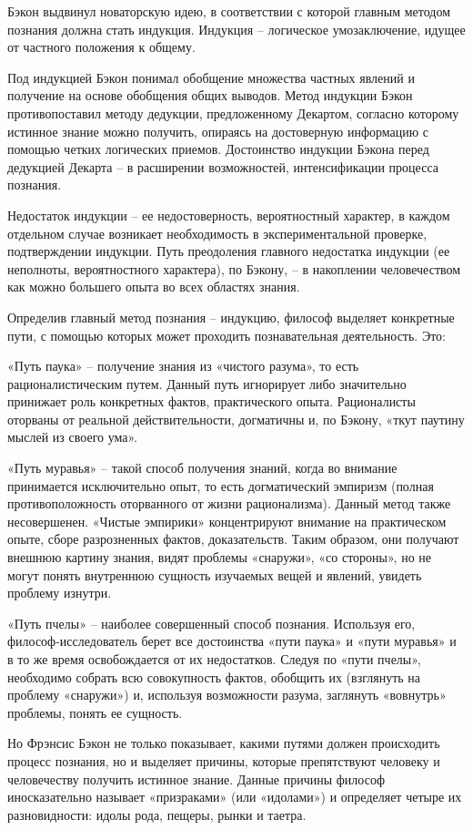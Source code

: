 \documentclass[
]{article}
\begin{document}
Бэкон выдвинул новаторскую идею, в соответствии с которой главным
методом познания должна стать индукция. Индукция -- логическое
умозаключение, идущее от частного положения к общему.

Под индукцией Бэкон понимал обобщение множества частных явлений и
получение на основе обобщения общих выводов. Метод индукции Бэкон
противопоставил методу дедукции, предложенному Декартом, согласно
которому истинное знание можно получить, опираясь на достоверную
информацию с помощью четких логических приемов. Достоинство индукции
Бэкона перед дедукцией Декарта -- в расширении возможностей,
интенсификации процесса познания.

Недостаток индукции -- ее недостоверность, вероятностный характер, в
каждом отдельном случае возникает необходимость в экспериментальной
проверке, подтверждении индукции. Путь преодоления главного недостатка
индукции (ее неполноты, вероятностного характера), по Бэкону, -- в
накоплении человечеством как можно большего опыта во всех областях
знания.

Определив главный метод познания -- индукцию, философ выделяет
конкретные пути, с помощью которых может проходить познавательная
деятельность. Это:

«Путь паука» -- получение знания из «чистого разума», то есть
рационалистическим путем. Данный путь игнорирует либо значительно
принижает роль конкретных фактов, практического опыта. Рационалисты
оторваны от реальной действительности, догматичны и, по Бэкону, «ткут
паутину мыслей из своего ума».

«Путь муравья» -- такой способ получения знаний, когда во внимание
принимается исключительно опыт, то есть догматический эмпиризм (полная
противоположность оторванного от жизни рационализма). Данный метод также
несовершенен. «Чистые эмпирики» концентрируют внимание на практическом
опыте, сборе разрозненных фактов, доказательств. Таким образом, они
получают внешнюю картину знания, видят проблемы «снаружи», «со стороны»,
но не могут понять внутреннюю сущность изучаемых вещей и явлений,
увидеть проблему изнутри.

«Путь пчелы» -- наиболее совершенный способ познания. Используя его,
философ-исследователь берет все достоинства «пути паука» и «пути
муравья» и в то же время освобождается от их недостатков. Следуя по
«пути пчелы», необходимо собрать всю совокупность фактов, обобщить их
(взглянуть на проблему «снаружи») и, используя возможности разума,
заглянуть «вовнутрь» проблемы, понять ее сущность.

Но Фрэнсис Бэкон не только показывает, какими путями должен происходить
процесс познания, но и выделяет причины, которые препятствуют человеку и
человечеству получить истинное знание. Данные причины философ
иносказательно называет «призраками» (или «идолами») и определяет четыре
их разновидности: идолы рода, пещеры, рынки и таетра.
\end{document}
